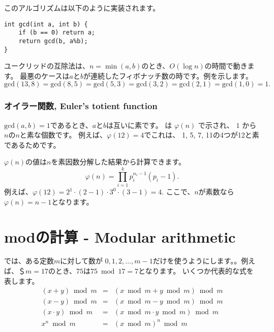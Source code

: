 このアルゴリズムは以下のように実装されます。
\begin{lstlisting}
int gcd(int a, int b) {
    if (b == 0) return a;
    return gcd(b, a%b);
}
\end{lstlisting}

ユークリッドの互除法は、$n=\min(a,b)$のとき、$O(\log n)$の時間で動きます。
最悪のケースは$a$と$b$が連続したフィボナッチ数の時です。例を示します。
\[\textrm{gcd}(13,8)=\textrm{gcd}(8,5)
=\textrm{gcd}(5,3)=\textrm{gcd}(3,2)=\textrm{gcd}(2,1)=\textrm{gcd}(1,0)=1.\]

\subsubsection{オイラー関数, Euler's totient function}


$\textrm{gcd}(a,b)=1$であるとき、$a$と$b$は互いに素です。
 は
$\varphi(n)$ で示され、
$1$ から $n$の$n$と素な個数です。
例えば、$\varphi(12)=4$でこれは、
1, 5, 7, 11の4つが12と素であるためです。

$\varphi(n)$の値は$n$を素因数分解した結果から計算できます。
\[ \varphi(n) = \prod_{i=1}^k p_i^{\alpha_i-1}(p_i-1). \]
例えば、$\varphi(12)=2^1 \cdot (2-1) \cdot 3^0 \cdot (3-1)=4$.
ここで、$n$が素数なら$\varphi(n)=n-1$となります。

\section{modの計算 - Modular arithmetic}


では、ある定数$m$に対して数が
$0,1,2,\ldots,m-1$だけを使うようにします。。例えば、＄$m=17$のとき、$75$は$75 \bmod 17 = 7$となります。
いくつか代表的な式を表します。
\[
\begin{array}{rcl}
(x+y) \bmod m & = & (x \bmod m + y \bmod m) \bmod m \\
(x-y) \bmod m & = & (x \bmod m - y \bmod m) \bmod m \\
(x \cdot y) \bmod m & = & (x \bmod m \cdot y \bmod m) \bmod m \\
x^n \bmod m & = & (x \bmod m)^n \bmod m \\
\end{array}
\]

